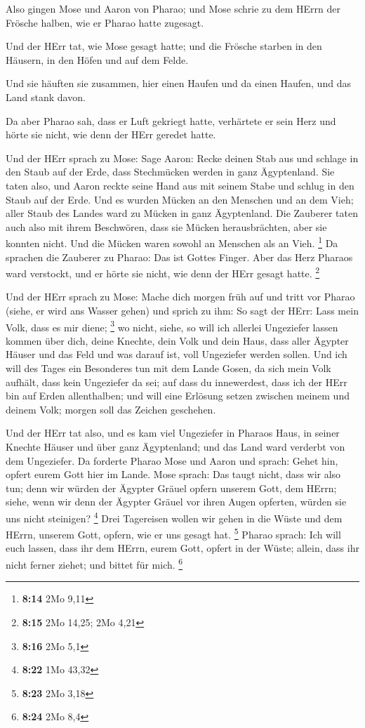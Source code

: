  Also gingen Mose und Aaron von Pharao; und Mose schrie zu
dem HErrn der Frösche halben, wie er Pharao hatte zugesagt.

 Und der HErr tat, wie Mose gesagt hatte; und die Frösche
starben in den Häusern, in den Höfen und auf dem Felde.

 Und sie häuften sie zusammen, hier einen Haufen und da
einen Haufen, und das Land stank davon.

 Da aber Pharao sah, dass er Luft gekriegt hatte,
verhärtete er sein Herz und hörte sie nicht, wie denn der HErr geredet
hatte.

 Und der HErr sprach zu Mose: Sage Aaron: Recke deinen Stab
aus und schlage in den Staub auf der Erde, dass Stechmücken werden in
ganz Ägyptenland.  Sie taten also, und Aaron reckte seine
Hand aus mit seinem Stabe und schlug in den Staub auf der Erde. Und es
wurden Mücken an den Menschen und an dem Vieh; aller Staub des Landes
ward zu Mücken in ganz Ägyptenland.  Die Zauberer taten
auch also mit ihrem Beschwören, dass sie Mücken herausbrächten, aber sie
konnten nicht. Und die Mücken waren sowohl an Menschen als an Vieh.
\footnote{\textbf{8:14} 2Mo 9,11}  Da sprachen die Zauberer
zu Pharao: Das ist Gottes Finger. Aber das Herz Pharaos ward verstockt,
und er hörte sie nicht, wie denn der HErr gesagt hatte. \footnote{\textbf{8:15}
  2Mo 14,25; 2Mo 4,21}

 Und der HErr sprach zu Mose: Mache dich morgen früh auf
und tritt vor Pharao (siehe, er wird ans Wasser gehen) und sprich zu
ihm: So sagt der HErr: Lass mein Volk, dass es mir diene; \footnote{\textbf{8:16}
  2Mo 5,1}  wo nicht, siehe, so will ich allerlei
Ungeziefer lassen kommen über dich, deine Knechte, dein Volk und dein
Haus, dass aller Ägypter Häuser und das Feld und was darauf ist, voll
Ungeziefer werden sollen.  Und ich will des Tages ein
Besonderes tun mit dem Lande Gosen, da sich mein Volk aufhält, dass kein
Ungeziefer da sei; auf dass du innewerdest, dass ich der HErr bin auf
Erden allenthalben;  und will eine Erlösung setzen zwischen
meinem und deinem Volk; morgen soll das Zeichen geschehen.

 Und der HErr tat also, und es kam viel Ungeziefer in
Pharaos Haus, in seiner Knechte Häuser und über ganz Ägyptenland; und
das Land ward verderbt von dem Ungeziefer.  Da forderte
Pharao Mose und Aaron und sprach: Gehet hin, opfert eurem Gott hier im
Lande.  Mose sprach: Das taugt nicht, dass wir also tun;
denn wir würden der Ägypter Gräuel opfern unserem Gott, dem HErrn;
siehe, wenn wir denn der Ägypter Gräuel vor ihren Augen opferten, würden
sie uns nicht steinigen? \footnote{\textbf{8:22} 1Mo 43,32}
 Drei Tagereisen wollen wir gehen in die Wüste und dem
HErrn, unserem Gott, opfern, wie er uns gesagt hat. \footnote{\textbf{8:23}
  2Mo 3,18}  Pharao sprach: Ich will euch lassen, dass ihr
dem HErrn, eurem Gott, opfert in der Wüste; allein, dass ihr nicht
ferner ziehet; und bittet für mich. \footnote{\textbf{8:24} 2Mo 8,4}


